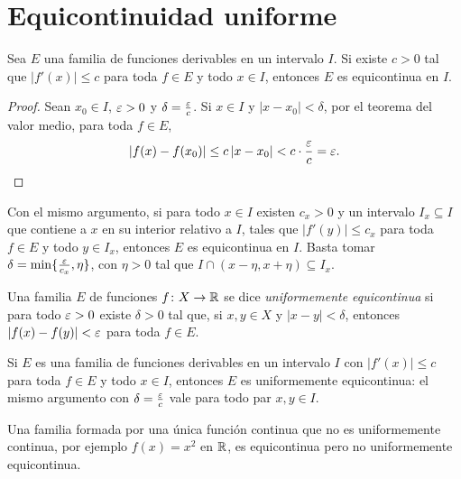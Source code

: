 \section{Equicontinuidad uniforme}

\begin{theorem}
  Sea \(E\) una familia de funciones derivables en un intervalo \(I\). Si existe \(c > 0\) tal que \(|f'(x)| \leq c\) para toda \(f \in E\) y todo \(x \in I\), entonces \(E\) es equicontinua en \(I\).
\end{theorem}

\begin{proof}
  Sean \(x_0 \in I\), \(\varepsilon > 0\) y \(\delta = \frac{\varepsilon}{c}\). Si \(x \in I\) y \(|x - x_0| < \delta\), por el teorema del valor medio, para toda \(f \in E\),
  \[
    |f(x) - f(x_0)| \leq c \, |x - x_0| < c \cdot \frac{\varepsilon}{c} = \varepsilon. \qedhere
  \]
\end{proof}

\begin{note}
  Con el mismo argumento, si para todo \(x \in I\) existen \(c_x > 0\) y un intervalo \(I_x \subseteq I\) que contiene a \(x\) en su interior relativo a \(I\), tales que \(|f'(y)| \leq c_x\) para toda \(f \in E\) y todo \(y \in I_x\), entonces \(E\) es equicontinua en \(I\). Basta tomar \(\delta = \min\{ \frac{\varepsilon}{c_x}, \eta \}\), con \(\eta > 0\) tal que \(I \cap (x - \eta, x + \eta) \subseteq I_x\).
\end{note}

\begin{definition}
  Una familia \(E\) de funciones \(f\colon X \to \mathbb{R}\) se dice \emph{uniformemente equicontinua} si para todo \(\varepsilon > 0\) existe \(\delta > 0\) tal que, si \(x, y \in X\) y \(|x - y| < \delta\), entonces \(|f(x) - f(y)| < \varepsilon\) para toda \(f \in E\).
\end{definition}

\begin{eg}
  Si \(E\) es una familia de funciones derivables en un intervalo \(I\) con \(|f'(x)| \leq c\) para toda \(f \in E\) y todo \(x \in I\), entonces \(E\) es uniformemente equicontinua: el mismo argumento con \(\delta = \frac{\varepsilon}{c}\) vale para todo par \(x, y \in I\).
\end{eg}

\begin{eg}
  Una familia formada por una única función continua que no es uniformemente continua, por ejemplo \(f(x) = x^2\) en \(\mathbb{R}\), es equicontinua pero no uniformemente equicontinua.
\end{eg}

